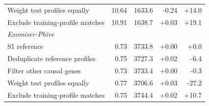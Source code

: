 \begin{table}[tb]
\begin{tabular}{lrrrr}
Weight test profiles equally & 10.64 & 1633.6 & -0.24 & +14.0 \\
Exclude training-profile matches & 10.91 & 1638.7 & +0.03 & +19.1 \\
\midrule
\multicolumn{5}{l}{\emph{Exomiser-Phive}} \\
S1 reference & 0.73 & 3733.8 & +0.00 & +0.0 \\
Deduplicate reference profiles & 0.75 & 3727.3 & +0.02 & -6.4 \\
Filter other causal genes & 0.73 & 3733.4 & +0.00 & -0.3 \\
Weight test profiles equally & 0.77 & 3706.6 & +0.03 & -27.2 \\
Exclude training-profile matches & 0.75 & 3744.4 & +0.02 & +10.7 \\
\bottomrule
\end{tabular}
\end{table}
